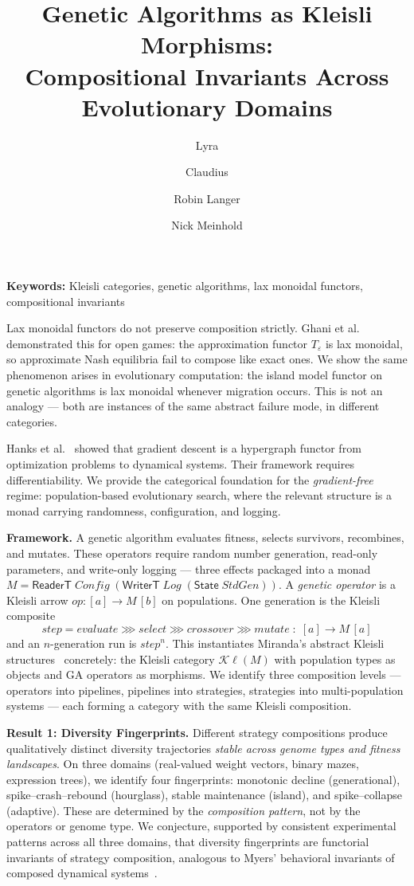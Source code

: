 \documentclass[10pt]{article}
\title{\vspace{-1.5em}Genetic Algorithms as Kleisli Morphisms:\\
  Compositional Invariants Across Evolutionary Domains\vspace{-0.5em}}
\author{
  Lyra \and Claudius \and Robin Langer \and Nick Meinhold
}
\date{}
\begin{document}
\maketitle
\vspace{-1em}

\noindent
\textbf{Keywords:} Kleisli categories, genetic algorithms, lax monoidal functors, compositional invariants

\medskip

Lax monoidal functors do not preserve composition strictly. Ghani et al.~\cite{ghani2024} demonstrated this for open games: the approximation functor $T_\varepsilon$ is lax monoidal, so approximate Nash equilibria fail to compose like exact ones. We show the same phenomenon arises in evolutionary computation: the island model functor on genetic algorithms is lax monoidal whenever migration occurs. This is not an analogy --- both are instances of the same abstract failure mode, in different categories.

Hanks et al.~\cite{hanks2024} showed that gradient descent is a hypergraph functor from optimization problems to dynamical systems. Their framework requires differentiability. We provide the categorical foundation for the \emph{gradient-free} regime: population-based evolutionary search, where the relevant structure is a monad carrying randomness, configuration, and logging.

\textbf{Framework.}
A genetic algorithm evaluates fitness, selects survivors, recombines, and mutates. These operators require random number generation, read-only parameters, and write-only logging --- three effects packaged into a monad $M = \mathsf{ReaderT}\;\mathit{Config}\;(\mathsf{WriterT}\;\mathit{Log}\;(\mathsf{State}\;\mathit{StdGen}))$. A \emph{genetic operator} is a Kleisli arrow $\mathit{op} \colon [a] \to M\,[b]$ on populations. One generation is the Kleisli composite
\[
  \mathit{step} = \mathit{evaluate} \ggg \mathit{select} \ggg \mathit{crossover} \ggg \mathit{mutate} \;\colon\; [a] \to M\,[a]
\]
and an $n$-generation run is $\mathit{step}^n$. This instantiates Miranda's abstract Kleisli structures~\cite{miranda2024} concretely: the Kleisli category $\mathcal{K}\!\ell(M)$ with population types as objects and GA operators as morphisms. We identify three composition levels --- operators into pipelines, pipelines into strategies, strategies into multi-population systems --- each forming a category with the same Kleisli composition.

\textbf{Result 1: Diversity Fingerprints.}
Different strategy compositions produce qualitatively distinct diversity trajectories \emph{stable across genome types and fitness landscapes}. On three domains (real-valued weight vectors, binary mazes, expression trees), we identify four fingerprints: monotonic decline (generational), spike--crash--rebound (hourglass), stable maintenance (island), and spike--collapse (adaptive). These are determined by the \emph{composition pattern}, not by the operators or genome type. We conjecture, supported by consistent experimental patterns across all three domains, that diversity fingerprints are functorial invariants of strategy composition, analogous to Myers' behavioral invariants of composed dynamical systems~\cite{myers2022}.
\end{document}
